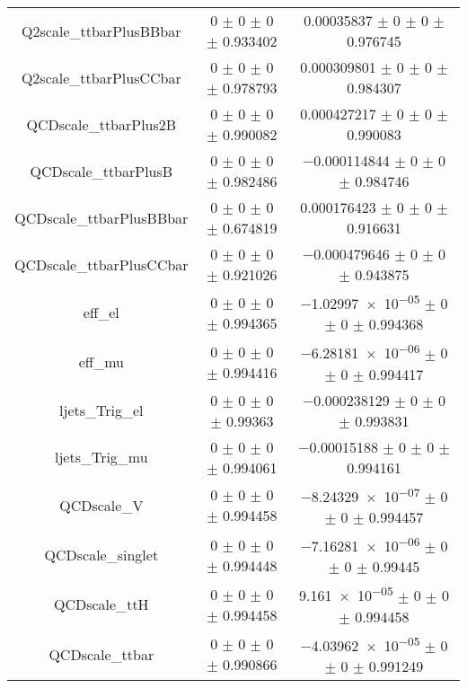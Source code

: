 \begin{table}
\begin{tabular}{ccc}
Q2scale\_ttbarPlusBBbar & \num{0} $\pm$ \num{0} $\pm$ \num{0} $\pm$ \num{0.933402} & \num{0.00035837} $\pm$ \num{0} $\pm$ \num{0} $\pm$ \num{0.976745}\\
Q2scale\_ttbarPlusCCbar & \num{0} $\pm$ \num{0} $\pm$ \num{0} $\pm$ \num{0.978793} & \num{0.000309801} $\pm$ \num{0} $\pm$ \num{0} $\pm$ \num{0.984307}\\
QCDscale\_ttbarPlus2B & \num{0} $\pm$ \num{0} $\pm$ \num{0} $\pm$ \num{0.990082} & \num{0.000427217} $\pm$ \num{0} $\pm$ \num{0} $\pm$ \num{0.990083}\\
QCDscale\_ttbarPlusB & \num{0} $\pm$ \num{0} $\pm$ \num{0} $\pm$ \num{0.982486} & \num{-0.000114844} $\pm$ \num{0} $\pm$ \num{0} $\pm$ \num{0.984746}\\
QCDscale\_ttbarPlusBBbar & \num{0} $\pm$ \num{0} $\pm$ \num{0} $\pm$ \num{0.674819} & \num{0.000176423} $\pm$ \num{0} $\pm$ \num{0} $\pm$ \num{0.916631}\\
QCDscale\_ttbarPlusCCbar & \num{0} $\pm$ \num{0} $\pm$ \num{0} $\pm$ \num{0.921026} & \num{-0.000479646} $\pm$ \num{0} $\pm$ \num{0} $\pm$ \num{0.943875}\\
eff\_el & \num{0} $\pm$ \num{0} $\pm$ \num{0} $\pm$ \num{0.994365} & \num{-1.02997e-05} $\pm$ \num{0} $\pm$ \num{0} $\pm$ \num{0.994368}\\
eff\_mu & \num{0} $\pm$ \num{0} $\pm$ \num{0} $\pm$ \num{0.994416} & \num{-6.28181e-06} $\pm$ \num{0} $\pm$ \num{0} $\pm$ \num{0.994417}\\
ljets\_Trig\_el & \num{0} $\pm$ \num{0} $\pm$ \num{0} $\pm$ \num{0.99363} & \num{-0.000238129} $\pm$ \num{0} $\pm$ \num{0} $\pm$ \num{0.993831}\\
ljets\_Trig\_mu & \num{0} $\pm$ \num{0} $\pm$ \num{0} $\pm$ \num{0.994061} & \num{-0.00015188} $\pm$ \num{0} $\pm$ \num{0} $\pm$ \num{0.994161}\\
QCDscale\_V & \num{0} $\pm$ \num{0} $\pm$ \num{0} $\pm$ \num{0.994458} & \num{-8.24329e-07} $\pm$ \num{0} $\pm$ \num{0} $\pm$ \num{0.994457}\\
QCDscale\_singlet & \num{0} $\pm$ \num{0} $\pm$ \num{0} $\pm$ \num{0.994448} & \num{-7.16281e-06} $\pm$ \num{0} $\pm$ \num{0} $\pm$ \num{0.99445}\\
QCDscale\_ttH & \num{0} $\pm$ \num{0} $\pm$ \num{0} $\pm$ \num{0.994458} & \num{9.161e-05} $\pm$ \num{0} $\pm$ \num{0} $\pm$ \num{0.994458}\\
QCDscale\_ttbar & \num{0} $\pm$ \num{0} $\pm$ \num{0} $\pm$ \num{0.990866} & \num{-4.03962e-05} $\pm$ \num{0} $\pm$ \num{0} $\pm$ \num{0.991249}\\

\end{tabular}
\end{table}
